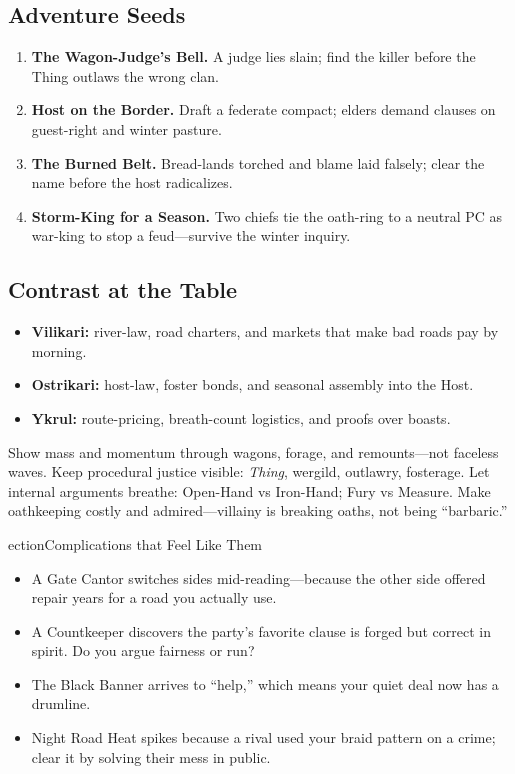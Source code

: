 \documentclass[11pt,letterpaper]{article}
\begin{document}
\subsection*{Adventure Seeds}
\begin{enumerate}
  \item \textbf{The Wagon-Judge's Bell.} A judge lies slain; find the killer before the Thing outlaws the wrong clan.
  \item \textbf{Host on the Border.} Draft a federate compact; elders demand clauses on guest-right and winter pasture.
  \item \textbf{The Burned Belt.} Bread-lands torched and blame laid falsely; clear the name before the host radicalizes.
  \item \textbf{Storm-King for a Season.} Two chiefs tie the oath-ring to a neutral PC as war-king to stop a feud---survive the winter inquiry.
\end{enumerate}

\subsection*{Contrast at the Table}
\begin{itemize}
  \item \textbf{Vilikari:} river-law, road charters, and markets that make bad roads pay by morning.
  \item \textbf{Ostrikari:} host-law, foster bonds, and seasonal assembly into the Host.
  \item \textbf{Ykrul:} route-pricing, breath-count logistics, and proofs over boasts.
\end{itemize}

\begin{fatebox}
Show mass and momentum through wagons, forage, and remounts---not faceless waves. Keep procedural justice visible: \emph{Thing}, wergild, outlawry, fosterage. Let internal arguments breathe: Open-Hand vs Iron-Hand; Fury vs Measure. Make oathkeeping costly and admired---villainy is breaking oaths, not being ``barbaric.''
\end{fatebox}

ection{Complications that Feel Like Them}

\begin{itemize}
\item A Gate Cantor switches sides mid-reading---because the other side offered repair years for a road you actually use.

\item A Countkeeper discovers the party's favorite clause is forged but correct in spirit. Do you argue fairness or run?

\item The Black Banner arrives to ``help,'' which means your quiet deal now has a drumline.

\item Night Road Heat spikes because a rival used your braid pattern on a crime; clear it by solving their mess in public.
\end{itemize}
\end{document}
